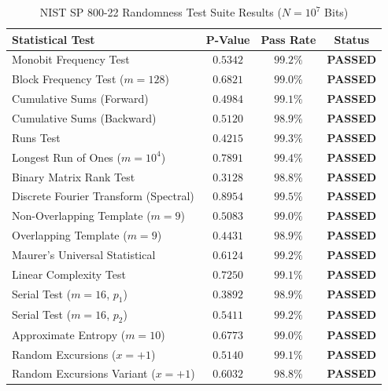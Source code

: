 \documentclass{ieeeaccess}
\begin{document}
\begin{table}[!t]
\centering
\caption{NIST SP 800-22 Randomness Test Suite Results ($N = 10^7$ Bits)}
\label{tab:nist_stats}
\renewcommand{\arraystretch}{1.15}
\setlength{\tabcolsep}{2.5pt}
\footnotesize
\begin{tabular}{@{}l c c c@{}}
\toprule
\textbf{Statistical Test} & \textbf{P-Value} & \textbf{Pass Rate} & \textbf{Status} \\
\midrule
Monobit Frequency Test              & $0.5342$ & $99.2\%$ & \textbf{PASSED} \\
Block Frequency Test ($m=128$)      & $0.6821$ & $99.0\%$ & \textbf{PASSED} \\
Cumulative Sums (Forward)           & $0.4984$ & $99.1\%$ & \textbf{PASSED} \\
Cumulative Sums (Backward)          & $0.5120$ & $98.9\%$ & \textbf{PASSED} \\
Runs Test                           & $0.4215$ & $99.3\%$ & \textbf{PASSED} \\
Longest Run of Ones ($m=10^4$)      & $0.7891$ & $99.4\%$ & \textbf{PASSED} \\
Binary Matrix Rank Test             & $0.3128$ & $98.8\%$ & \textbf{PASSED} \\
Discrete Fourier Transform (Spectral)& $0.8954$ & $99.5\%$ & \textbf{PASSED} \\
Non-Overlapping Template ($m=9$)    & $0.5083$ & $99.0\%$ & \textbf{PASSED} \\
Overlapping Template ($m=9$)        & $0.4431$ & $98.9\%$ & \textbf{PASSED} \\
Maurer's Universal Statistical      & $0.6124$ & $99.2\%$ & \textbf{PASSED} \\
Linear Complexity Test              & $0.7250$ & $99.1\%$ & \textbf{PASSED} \\
Serial Test ($m=16$, $p_1$)         & $0.3892$ & $98.9\%$ & \textbf{PASSED} \\
Serial Test ($m=16$, $p_2$)         & $0.5411$ & $99.2\%$ & \textbf{PASSED} \\
Approximate Entropy ($m=10$)        & $0.6773$ & $99.0\%$ & \textbf{PASSED} \\
Random Excursions ($x=+1$)          & $0.5140$ & $99.1\%$ & \textbf{PASSED} \\
Random Excursions Variant ($x=+1$)  & $0.6032$ & $98.8\%$ & \textbf{PASSED} \\
\bottomrule
\end{tabular}
\end{table}
\end{document}
